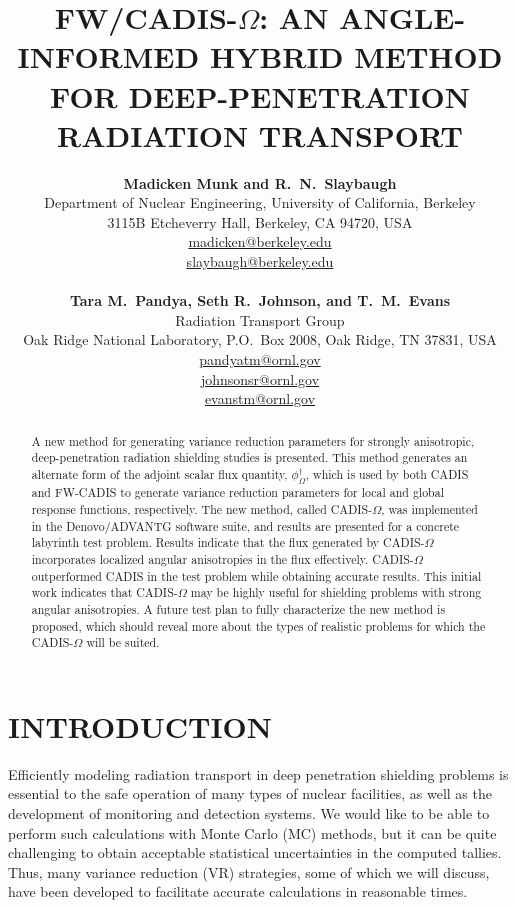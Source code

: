 \documentclass[12pt]{article}
\title{FW/CADIS-$\Omega$: AN ANGLE-INFORMED HYBRID METHOD FOR DEEP-PENETRATION RADIATION TRANSPORT}
\author{ 
  \textbf{Madicken Munk and R.~N.~Slaybaugh} \\
  Department of Nuclear Engineering, University of California, Berkeley \\
  3115B Etcheverry Hall, Berkeley, CA 94720, USA\\
  \href{mailto:madicken@berkeley.edu}{madicken@berkeley.edu}\\
  \href{mailto:slaybaugh@berkeley.edu}{slaybaugh@berkeley.edu}\\
  \\
  \textbf{Tara M.~Pandya, Seth R.~Johnson, and T.~M.~Evans}\\
  Radiation Transport Group\\
  Oak Ridge National Laboratory, P.O.\ Box 2008, Oak Ridge, TN 37831, USA\\
  \href{mailto:pandyatm@ornl.gov}{pandyatm@ornl.gov}\\
  \href{mailto:johnsonsr@ornl.gov}{johnsonsr@ornl.gov}\\
  \href{mailto:evanstm@ornl.gov}{evanstm@ornl.gov}
  }
\begin{document}


\maketitle

\begin{abstract}
A new method for generating variance reduction parameters for strongly anisotropic, deep-penetration radiation shielding studies is presented. This method generates an alternate form of the adjoint scalar flux quantity, $\phi^{\dagger}_{\Omega}$, which is used by both CADIS and FW-CADIS to generate variance reduction parameters for local and global response functions, respectively. The new method, called CADIS-$\Omega$, was implemented in the Denovo/ADVANTG software suite, and results are presented for a concrete labyrinth test problem. Results indicate that the flux generated by CADIS-$\Omega$ incorporates localized angular anisotropies in the flux effectively. CADIS-$\Omega$ outperformed CADIS in the test problem while obtaining accurate results. This initial work indicates that CADIS-$\Omega$ may be highly useful for shielding problems with strong angular anisotropies. A future test plan to fully characterize the new method is proposed, which should reveal more about the types of realistic problems for which the CADIS-$\Omega$ will be suited. 
\end{abstract}


%
\section{INTRODUCTION}
\label{sect::intro}

Efficiently modeling radiation transport in deep penetration shielding problems is essential to the safe operation of many types of nuclear facilities, as well as the development of monitoring and detection systems. We would like to be able to perform such calculations with Monte Carlo (MC) methods, but it can be quite challenging to obtain acceptable statistical uncertainties in the computed tallies. Thus, many variance reduction (VR) strategies, some of which we will discuss, have been developed to facilitate accurate calculations in reasonable times. 
\end{document}
